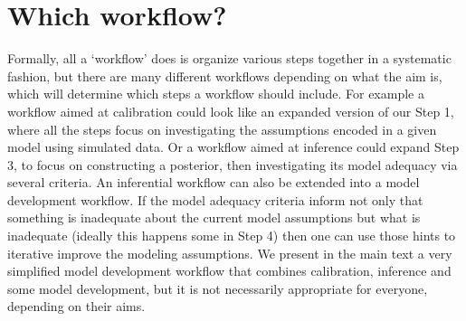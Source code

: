 \documentclass[11pt]{article}
\begin{document}


\section*{Which workflow?}

Formally, all a `workflow' does is organize various steps together in a systematic fashion, but there are many different workflows depending on what the aim is, which will determine which steps a workflow should include. For example a workflow aimed at calibration could look like an expanded version of our Step 1, where all the steps focus on investigating the assumptions encoded in a given model using simulated data. Or a workflow aimed at inference could expand Step 3, to focus on constructing a posterior, then investigating its model adequacy via several criteria. An inferential workflow can also be extended into a model development workflow.  If the model adequacy criteria inform not only that something is inadequate about the current model assumptions but what is inadequate (ideally this happens some in Step 4) then one can use those hints to iterative improve the modeling assumptions. We present in the main text a very simplified model development workflow that combines calibration, inference and some model development, but it is not necessarily appropriate for everyone, depending on their aims.
\end{document}
